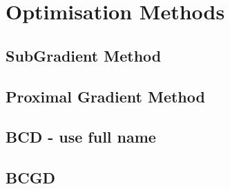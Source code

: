 
\section{Optimisation Methods}
\label{sec:optMethods}

\subsection{SubGradient Method}


\subsection{Proximal Gradient Method}


\subsection{BCD - use full name}


\subsection{BCGD}


